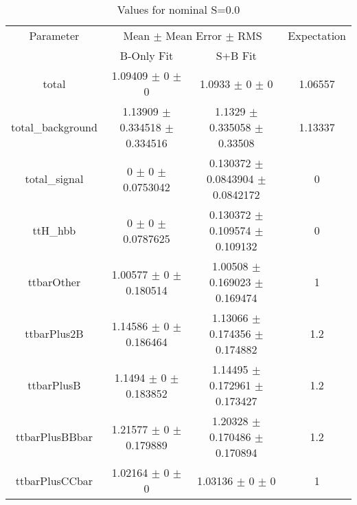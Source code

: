 \begin{table}
\centering
\caption{Values for nominal S=0.0}
\begin{tabular}{cccc}
\toprule
Parameter & \multicolumn{2}{c}{Mean $\pm$ Mean Error $\pm$ RMS} & Expectation\\
 & B-Only Fit & S+B Fit & \\
\midrule
total & \num{1.09409} $\pm$ \num{0} $\pm$ \num{0} & \num{1.0933} $\pm$ \num{0} $\pm$ \num{0} & \num{1.06557}\\
total\_background & \num{1.13909} $\pm$ \num{0.334518} $\pm$ \num{0.334516} & \num{1.1329} $\pm$ \num{0.335058} $\pm$ \num{0.33508} & \num{1.13337}\\
total\_signal & \num{0} $\pm$ \num{0} $\pm$ \num{0.0753042} & \num{0.130372} $\pm$ \num{0.0843904} $\pm$ \num{0.0842172} & \num{0}\\
ttH\_hbb & \num{0} $\pm$ \num{0} $\pm$ \num{0.0787625} & \num{0.130372} $\pm$ \num{0.109574} $\pm$ \num{0.109132} & \num{0}\\
ttbarOther & \num{1.00577} $\pm$ \num{0} $\pm$ \num{0.180514} & \num{1.00508} $\pm$ \num{0.169023} $\pm$ \num{0.169474} & \num{1}\\
ttbarPlus2B & \num{1.14586} $\pm$ \num{0} $\pm$ \num{0.186464} & \num{1.13066} $\pm$ \num{0.174356} $\pm$ \num{0.174882} & \num{1.2}\\
ttbarPlusB & \num{1.1494} $\pm$ \num{0} $\pm$ \num{0.183852} & \num{1.14495} $\pm$ \num{0.172961} $\pm$ \num{0.173427} & \num{1.2}\\
ttbarPlusBBbar & \num{1.21577} $\pm$ \num{0} $\pm$ \num{0.179889} & \num{1.20328} $\pm$ \num{0.170486} $\pm$ \num{0.170894} & \num{1.2}\\
ttbarPlusCCbar & \num{1.02164} $\pm$ \num{0} $\pm$ \num{0} & \num{1.03136} $\pm$ \num{0} $\pm$ \num{0} & \num{1}\\
\bottomrule
\end{tabular}
\end{table}